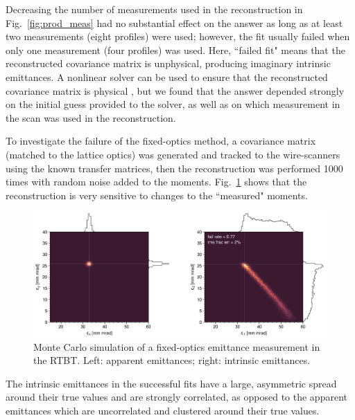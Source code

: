 Decreasing the number of measurements used in the reconstruction in Fig.~\ref{fig:prod_meas} had no substantial effect on the answer as long as at least two measurements (eight profiles) were used; however, the fit usually failed when only one measurement (four profiles) was used. Here, ``failed fit" means that the reconstructed covariance matrix is unphysical, producing imaginary intrinsic emittances. A nonlinear solver can be used to ensure that the reconstructed covariance matrix is physical \cite{Raimondi1993}, but we found that the answer depended strongly on the initial guess provided to the solver, as well as on which measurement in the scan was used in the reconstruction.

To investigate the failure of the fixed-optics method, a covariance matrix (matched to the lattice optics) was generated and tracked to the wire-scanners using the known transfer matrices, then the reconstruction was performed 1000 times with random noise added to the moments. Fig.~\ref{fig:prod_sensitivity} shows that the reconstruction is very sensitive to changes to the ``measured" moments.
%
\begin{figure}[!p]
    \vspace*{5cm}
    \includegraphics[width=\textwidth]{Images/chapter4/prod_sensitivity3.png}
    \caption{Monte Carlo simulation of a fixed-optics emittance measurement in the RTBT. Left: apparent emittances; right: intrinsic emittances.}
    \label{fig:prod_sensitivity}
    \vspace*{5cm}
\end{figure}
%
The intrinsic emittances in the successful fits have a large, asymmetric spread around their true values and are strongly correlated, as opposed to the apparent emittances which are uncorrelated and clustered around their true values.

